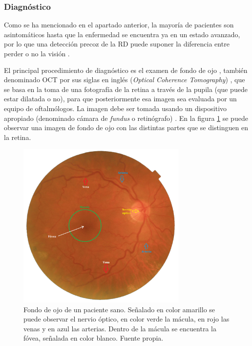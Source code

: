 \titlespacing{\subsubsection}{0pt}{0.25cm}{0.1cm}
\subsubsection{Diagnóstico}

Como se ha mencionado en el apartado anterior, la mayoría de pacientes son asintomáticos hasta que la enfermedad se encuentra ya en un estado avanzado, por lo que una detección precoz de la RD puede suponer la diferencia entre perder o no la visión \cite{diabetes:JDI}.

El principal procedimiento de diagnóstico es el examen de fondo de ojo \cite{retinopatia:Retinal_and_eye}, también denominado OCT por sus siglas en inglés (\textit{Optical Coherence Tomography}) \cite{retino:OMS}, que se basa en la toma de una fotografía de la retina a través de la pupila (que puede estar dilatada o no), para que posteriormente esa imagen sea evaluada por un equipo de oftalmólogos. La imagen debe ser tomada usando un dispositivo apropiado (denominado cámara de \textit{fundus} o retinógrafo) \cite{retino:tecnica_fundus}. En la figura \ref{fig:partes_retina} se puede observar una imagen de fondo de ojo con las distintas partes que se distinguen en la retina.

\begin{figure}[h]
    \centering
    \includegraphics[width=0.75\textwidth]{img/partes_retina.png}
    \caption{Fondo de ojo de un paciente sano. Señalado en color amarillo se puede observar el nervio óptico, en color verde la mácula, en rojo las venas y en azul las arterias. Dentro de la mácula se encuentra la fóvea, señalada en color blanco. Fuente propia.}
    \label{fig:partes_retina}
\end{figure}

